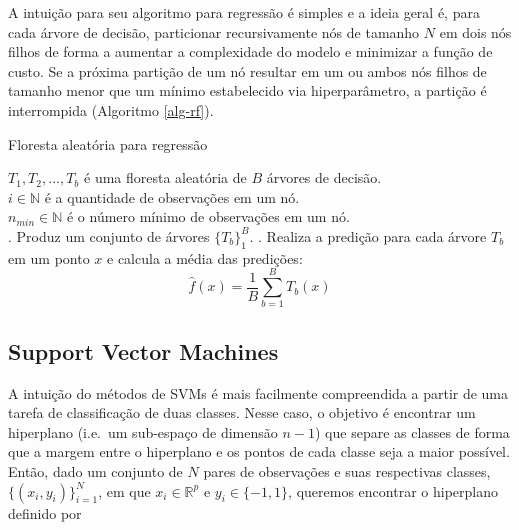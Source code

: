 \documentclass[
  12pt,
  twoside,
  openright,
  a4paper,
  chapter=TITLE,
  section=TITLE,
  brazil]{abntex2}
\begin{document}
\begin{apendicesenv}
A intuição para seu algoritmo para regressão é simples e a ideia geral
é, para cada árvore de decisão, particionar recursivamente nós de
tamanho \(N\) em dois nós filhos de forma a aumentar a complexidade do
modelo e minimizar a função de custo. Se a próxima partição de um nó
resultar em um ou ambos nós filhos de tamanho menor que um mínimo
estabelecido via hiperparâmetro, a partição é interrompida (Algoritmo
\ref{alg-rf}).

\begin{algorithm}
\caption{Floresta aleatória para regressão}\label{alg-rf}

${T_1, T_2, ..., T_b}$ é uma floresta aleatória de $B$ árvores de decisão. \\
\BlankLine
$i \in \mathbb{N}$ é a quantidade de observações em um nó. \\
\BlankLine
$n_{min} \in \mathbb{N}$ é o número mínimo de observações em um nó. \\
\BlankLine
{}
. Produz um conjunto de árvores $\{T_b\}_1^B$.
. Realiza a predição para cada árvore $T_b$ em um ponto $x$ e calcula a média das predições:
$$\hat{f}(x) = \frac{1}{B}\sum_{b=1}^B T_b(x)$$

\end{algorithm}

\subsection{Support Vector Machines}\label{support-vector-machines}

A intuição do métodos de SVMs é mais facilmente compreendida a partir de
uma tarefa de classificação de duas classes. Nesse caso, o objetivo é
encontrar um hiperplano (i.e.~um sub-espaço de dimensão \(n-1\)) que
separe as classes de forma que a margem entre o hiperplano e os pontos
de cada classe seja a maior possível. Então, dado um conjunto de \(N\)
pares de observações e suas respectivas classes,
\(\{(x_i, y_i)\}_{i=1}^N\), em que \(x_i \in \mathbb{R}^p\) e
\(y_i \in \{-1, 1\}\), queremos encontrar o hiperplano definido por


\end{apendicesenv}
\end{document}
